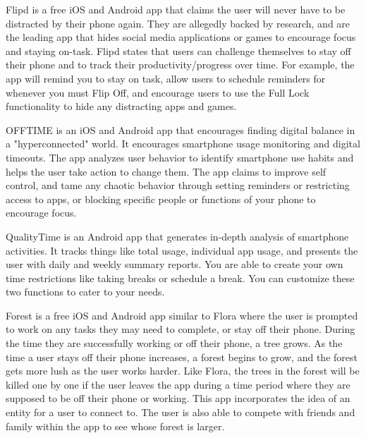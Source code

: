 \documentclass[12pt, title page, manuscript, nonacm]{acmart}
\begin{document}
Flipd\cite{flipd} is a free iOS and Android app that claims the user will never have to be distracted by their phone again. They are allegedly backed by research, and are the leading app that hides social media applications or games to encourage focus and staying on-task. Flipd states that users can challenge themselves to stay off their phone and to track their productivity/progress over time. For example, the app will remind you to stay on task, allow users to schedule reminders for whenever you must Flip Off, and encourage users to use the Full Lock functionality to hide any distracting apps and games.
\par 
OFFTIME\cite{offtime} is an iOS and Android app that encourages finding digital balance in a "hyperconnected" world. It encourages smartphone usage monitoring and digital timeouts. The app analyzes user behavior to identify smartphone use habits and helps the user take action to change them. The app claims to improve self control, and tame any chaotic behavior through setting reminders or restricting access to apps, or blocking specific people or functions of your phone to encourage focus.
\par 
QualityTime\cite{qualityTime} is an Android app that generates in-depth analysis of smartphone activities. It tracks things like total usage, individual app usage, and presents the user with daily and weekly summary reports. You are able to create your own time restrictions like taking breaks or schedule a break. You can customize these two functions to cater to your needs.

\par 
Forest\cite{forrest} is a free iOS and Android app similar to Flora\cite{flora} where the user is prompted to work on any tasks they may need to complete, or stay off their phone. During the time they are successfully working or off their phone, a tree grows. As the time a user stays off their phone increases, a forest begins to grow, and the forest gets more lush as the user works harder. Like Flora, the trees in the forest will be killed one by one if the user leaves the app during a time period where they are supposed to be off their phone or working. This app incorporates the idea of an entity for a user to connect to. The user is also able to compete with friends and family within the app to see whose forest is larger.
\end{document}
